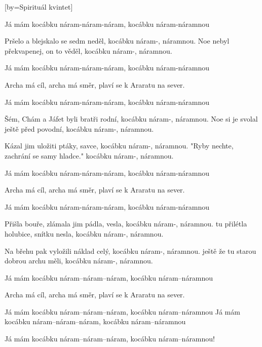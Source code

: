 [by={Spirituál kvintet}]

\beginverse{}
\lrep{}Já mám kocábku náram-náram-náram, kocábku náram-náramnou \rrep{}
\endverse{}

\beginverse{}
Pršelo a blejskalo se sedm neděl, kocábku náram-, náramnou.
Noe nebyl překvapenej, on to věděl, kocábku náram-, náramnou.
\endverse{}

\beginverse{}
\lrep{}Já mám kocábku náram-náram-náram, kocábku náram-náramnou \rrep{}
\endverse{}

\beginchorus{}
Archa má cíl, archa má směr, plaví se k Araratu na sever.
\endchorus{}

\beginverse{}
\lrep{}Já mám kocábku náram-náram-náram, kocábku náram-náramnou \rrep{}
\endverse{}

\beginverse{}
Šém, Chám a Jáfet byli bratři rodní, kocábku náram-, náramnou.
Noe si je svolal ještě před povodní, kocábku náram-, náramnou.
\endverse{}

\beginverse{}
Kázal jim uložiti ptáky, savce, kocábku náram-, náramnou.
"Ryby nechte, zachrání se samy hladce." kocábku náram-, náramnou.
\endverse{}

\beginverse{}
\lrep{}Já mám kocábku náram-náram-náram, kocábku náram-náramnou \rrep{}
\endverse{}

\beginchorus{}
Archa má cíl, archa má směr, plaví se k Araratu na sever.
\endchorus{}

\beginverse{}
\lrep{}Já mám kocábku náram-náram-náram, kocábku náram-náramnou \rrep{}
\endverse{}

\beginverse{}
Přišla bouře, zlámala jim pádla, vesla, kocábku náram-, náramnou.
tu přilétla holubice, snítku nesla, kocábku náram-, náramnou.
\endverse{}

\beginverse{}
Na břehu pak vyložili náklad celý, kocábku náram-, náramnou.
ještě že tu starou dobrou archu měli, kocábku náram-, náramnou.
\endverse{}

\beginverse{}
\lrep{}Já mám kocábku náram--náram--náram, kocábku náram--náramnou \rrep{}
\endverse{}

\beginchorus{}
Archa má cíl, archa má směr, plaví se k Araratu na sever.
\endchorus{}

\beginverse{}
\lrep{}Já mám kocábku náram--náram--náram, kocábku náram--náramnou \rrep{}
\lrep{}Já mám kocábku náram--náram--náram, kocábku náram--náramnou \rrep{}
\endverse{}

\beginverse{}
Já mám kocábku náram--náram--náram, kocábku náram--náramnou!
\endverse{}

\endsong{}
